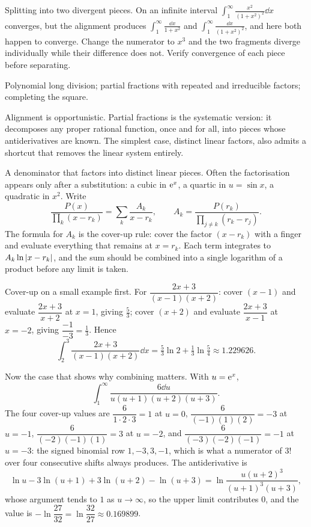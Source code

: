 \begin{trap}
Splitting into two divergent pieces. On an infinite interval $\displaystyle\int_1^\infty\frac{x^2}{(1+x^2)^2}\dd x$ converges, but the alignment produces $\int_1^\infty\frac{\dd x}{1+x^2}$ and $\int_1^\infty\frac{\dd x}{(1+x^2)^2}$, and here both happen to converge. Change the numerator to $x^3$ and the two fragments diverge individually while their difference does not. Verify convergence of each piece before separating.
\end{trap}

\begin{seealsob}Polynomial long division; partial fractions with repeated and irreducible factors; completing the square.\end{seealsob}

Alignment is opportunistic. Partial fractions is the systematic version: it decomposes any proper rational function, once and for all, into pieces whose antiderivatives are known. The simplest case, distinct linear factors, also admits a shortcut that removes the linear system entirely.

\cue A denominator that factors into distinct linear pieces. Often the factorisation appears only after a substitution: a cubic in $\mathrm{e}^x$, a quartic in $u=\sin x$, a quadratic in $x^2$.
\method Write
\[
\frac{P(x)}{\prod_{k}(x-r_k)}=\sum_k\frac{A_k}{x-r_k},\qquad
A_k=\frac{P(r_k)}{\prod_{j\neq k}(r_k-r_j)} .
\]
The formula for $A_k$ is the cover-up rule: cover the factor $(x-r_k)$ with a finger and evaluate everything that remains at $x=r_k$. Each term integrates to $A_k\ln\left\lvert x-r_k\right\rvert$, and the sum should be combined into a single logarithm of a product before any limit is taken.

\begin{worked}
Cover-up on a small example first. For $\dfrac{2x+3}{(x-1)(x+2)}$: cover $(x-1)$ and evaluate $\dfrac{2x+3}{x+2}$ at $x=1$, giving $\tfrac53$; cover $(x+2)$ and evaluate $\dfrac{2x+3}{x-1}$ at $x=-2$, giving $\dfrac{-1}{-3}=\tfrac13$. Hence
\[
\int_2^3\frac{2x+3}{(x-1)(x+2)}\dd x=\tfrac53\ln2+\tfrac13\ln\tfrac54\approx1.229626 .
\]

Now the case that shows why combining matters. With $u=\mathrm{e}^x$,
\[
\int_1^{\infty}\frac{6\dd u}{u(u+1)(u+2)(u+3)} .
\]
The four cover-up values are $\dfrac{6}{1\cdot2\cdot3}=1$ at $u=0$, $\dfrac{6}{(-1)(1)(2)}=-3$ at $u=-1$, $\dfrac{6}{(-2)(-1)(1)}=3$ at $u=-2$, and $\dfrac{6}{(-3)(-2)(-1)}=-1$ at $u=-3$: the signed binomial row $1,-3,3,-1$, which is what a numerator of $3!$ over four consecutive shifts always produces. The antiderivative is
\[
\ln u-3\ln(u+1)+3\ln(u+2)-\ln(u+3)=\ln\frac{u(u+2)^3}{(u+1)^3(u+3)},
\]
whose argument tends to $1$ as $u\to\infty$, so the upper limit contributes $0$, and the value is $-\ln\dfrac{27}{32}=\ln\dfrac{32}{27}\approx0.169899$.
\end{worked}

